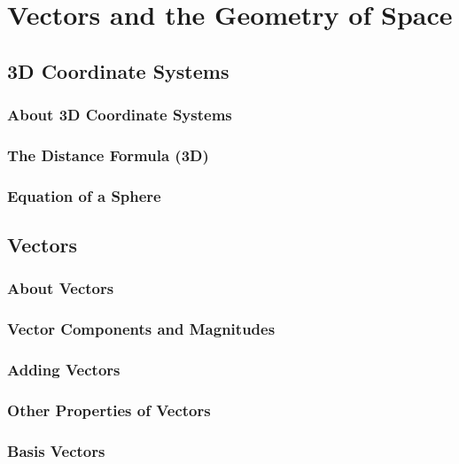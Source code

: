 \documentclass{package/notes}
\begin{document}
\chapter{Vectors and the Geometry of Space}

\section{3D Coordinate Systems}

\subsection{About 3D Coordinate Systems}

\subsection{The Distance Formula (3D)}

\subsection{Equation of a Sphere}



\section{Vectors}

\subsection{About Vectors}

\subsection{Vector Components and Magnitudes}

\subsection{Adding Vectors}

\subsection{Other Properties of Vectors}

\subsection{Basis Vectors}
\end{document}
